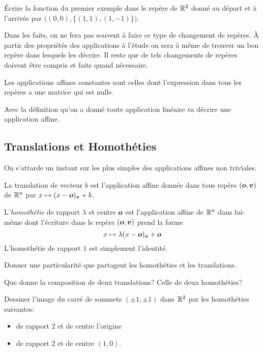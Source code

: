 \documentclass[11pt, a4paper]{article}
\begin{document}
\begin{question}
  Écrire la fonction du premier exemple dans le repère de $\mathbb{R}^2$ donné
  au départ et à l'arrivée par
  $\big((0, 0), \{(1, 1), (1, -1)\}\big)$.
\end{question}
\begin{rem}
  Dans les faits, on ne fera pas souvent à faire ce type de changement
  de repères. À partir des propriétés des applications à l'étude on
  sera à même de trouver un bon repère dans lesquels les décrire. Il
  reste que de tels changements de repères doivent être compris et
  faits quand nécessaire.
\end{rem}
\begin{exmp}
  Les applications affines constantes sont celles dont l'expression
  dans tous les repères a une matrice qui est nulle.
\end{exmp}
\begin{exmp}
  Avec la définition qu'on a donné toute application linéaire va
  décrire une application affine.
\end{exmp}

\subsection{Translations et Homothéties}

On s'attarde un instant sur les plus simples des applications affines
non triviales.
\begin{exmp}
  La translation de vecteur $b$ est l'application affine donnée dans
  tous repère $(\boldsymbol{o}, \boldsymbol{v})$ de $\mathbb{R}^n$ par
  $x \mapsto (x - \boldsymbol{o})_{\boldsymbol{v}} + b$.
\end{exmp}
\begin{exmp}
  L'\emph{homothétie} de rapport $\lambda$ et centre $\boldsymbol{o}$ est
  l'application affine de $\mathbb{R}^n$ dans lui-même dont l'écriture dans le
  repère $(\boldsymbol{o}, \boldsymbol{v})$ prend la forme
  \[
  x \mapsto \lambda (x - \boldsymbol{o})_{\boldsymbol{v}} + \boldsymbol{o}
  \]
  L'homothétie de rapport $1$ est simplement l'identité.
\end{exmp}
\begin{question}
  Donner une particularité que partagent les homothéties et les
  translations.
\end{question}
\begin{question}
  Que donne la composition de deux translations? Celle de deux
  homothéties?
\end{question}
\begin{question}
  Dessiner l'image du carré de sommets $(\pm 1, \pm 1)$
  dans $\mathbb{R}^2$ par les homothéties suivantes:
  \begin{itemize}
  \item[\textbullet]
    de rapport $2$ et de centre l'origine
  \item[\textbullet]
    de rapport $2$ et de centre $(1, 0)$.
  \end{itemize}
\end{question}
\end{document}
